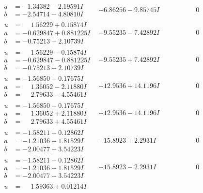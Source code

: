 \documentclass[1p]{elsarticle_modified}
\theoremstyle{definition}
\begin{document}
$$\begin{array}{c|c|c}
\begin{aligned}
a &= -1.34382 - 2.19591 I \\
b &= -2.54714 - 4.80810 I\end{aligned}
 & -6.86256 - 9.85745 I & \phantom{-0.000000 } 0 \\ \hline\begin{aligned}
u &= \phantom{-}1.56229 + 0.15874 I \\
a &= -0.629847 + 0.881225 I \\
b &= -0.75213 + 2.10739 I\end{aligned}
 & -9.55235 - 7.42892 I & \phantom{-0.000000 } 0 \\ \hline\begin{aligned}
u &= \phantom{-}1.56229 - 0.15874 I \\
a &= -0.629847 - 0.881225 I \\
b &= -0.75213 - 2.10739 I\end{aligned}
 & -9.55235 + 7.42892 I & \phantom{-0.000000 } 0 \\ \hline\begin{aligned}
u &= -1.56850 + 0.17675 I \\
a &= \phantom{-}1.36052 - 2.11880 I \\
b &= \phantom{-}2.79633 - 4.55461 I\end{aligned}
 & -12.9536 + 14.1196 I & \phantom{-0.000000 } 0 \\ \hline\begin{aligned}
u &= -1.56850 - 0.17675 I \\
a &= \phantom{-}1.36052 + 2.11880 I \\
b &= \phantom{-}2.79633 + 4.55461 I\end{aligned}
 & -12.9536 - 14.1196 I & \phantom{-0.000000 } 0 \\ \hline\begin{aligned}
u &= -1.58211 + 0.12862 I \\
a &= -1.21036 + 1.81529 I \\
b &= -2.00477 + 3.54223 I\end{aligned}
 & -15.8923 + 2.2931 I & \phantom{-0.000000 } 0 \\ \hline\begin{aligned}
u &= -1.58211 - 0.12862 I \\
a &= -1.21036 - 1.81529 I \\
b &= -2.00477 - 3.54223 I\end{aligned}
 & -15.8923 - 2.2931 I & \phantom{-0.000000 } 0 \\ \hline\begin{aligned}
u &= \phantom{-}1.59363 + 0.01214 I \\

\end{aligned}
\end{array}$$
\end{document}
